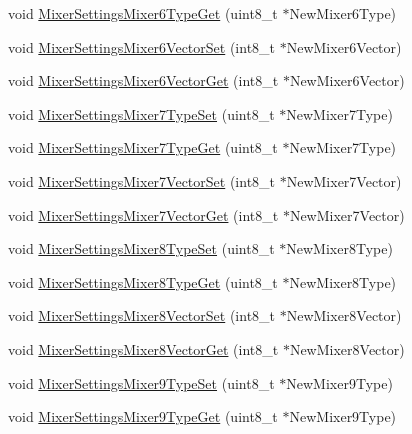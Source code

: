 \begin{DoxyCompactItemize}
\item 
void \hyperlink{group___mixer_settings_ga867c8ddbfe5eeecc73a49f323b0e1102}{\-Mixer\-Settings\-Mixer6\-Type\-Get} (uint8\-\_\-t $\ast$\-New\-Mixer6\-Type)
\item 
void \hyperlink{group___mixer_settings_ga4e138fe4b7e0dbe885fdba8619a4d1b4}{\-Mixer\-Settings\-Mixer6\-Vector\-Set} (int8\-\_\-t $\ast$\-New\-Mixer6\-Vector)
\item 
void \hyperlink{group___mixer_settings_ga7e8574c2d46f56da1f0b9b2e2ef96b11}{\-Mixer\-Settings\-Mixer6\-Vector\-Get} (int8\-\_\-t $\ast$\-New\-Mixer6\-Vector)
\item 
void \hyperlink{group___mixer_settings_gabfd79b4beb41976007029ba6ee34b0b0}{\-Mixer\-Settings\-Mixer7\-Type\-Set} (uint8\-\_\-t $\ast$\-New\-Mixer7\-Type)
\item 
void \hyperlink{group___mixer_settings_ga6fcb75ef643524929c21224b5a23c0b6}{\-Mixer\-Settings\-Mixer7\-Type\-Get} (uint8\-\_\-t $\ast$\-New\-Mixer7\-Type)
\item 
void \hyperlink{group___mixer_settings_gad1e93e50ad9b6d4ef66bdf2a7091ed41}{\-Mixer\-Settings\-Mixer7\-Vector\-Set} (int8\-\_\-t $\ast$\-New\-Mixer7\-Vector)
\item 
void \hyperlink{group___mixer_settings_ga6a2b60304bce49b10944138cdcb4b995}{\-Mixer\-Settings\-Mixer7\-Vector\-Get} (int8\-\_\-t $\ast$\-New\-Mixer7\-Vector)
\item 
void \hyperlink{group___mixer_settings_ga6513c98cb5dc02afb17f4793e3bf04e5}{\-Mixer\-Settings\-Mixer8\-Type\-Set} (uint8\-\_\-t $\ast$\-New\-Mixer8\-Type)
\item 
void \hyperlink{group___mixer_settings_gaa827e73bd575be29ff710964530373a0}{\-Mixer\-Settings\-Mixer8\-Type\-Get} (uint8\-\_\-t $\ast$\-New\-Mixer8\-Type)
\item 
void \hyperlink{group___mixer_settings_ga18f7f785b7ae1a45ac3378af792fb7f7}{\-Mixer\-Settings\-Mixer8\-Vector\-Set} (int8\-\_\-t $\ast$\-New\-Mixer8\-Vector)
\item 
void \hyperlink{group___mixer_settings_ga33002bb417bda04b293f71ded2586591}{\-Mixer\-Settings\-Mixer8\-Vector\-Get} (int8\-\_\-t $\ast$\-New\-Mixer8\-Vector)
\item 
void \hyperlink{group___mixer_settings_ga3c07abb147586925a493578211e336c7}{\-Mixer\-Settings\-Mixer9\-Type\-Set} (uint8\-\_\-t $\ast$\-New\-Mixer9\-Type)
\item 
void \hyperlink{group___mixer_settings_ga58fd0bf0d76bc42767d0cdafb2503e1a}{\-Mixer\-Settings\-Mixer9\-Type\-Get} (uint8\-\_\-t $\ast$\-New\-Mixer9\-Type)

\end{DoxyCompactItemize}
